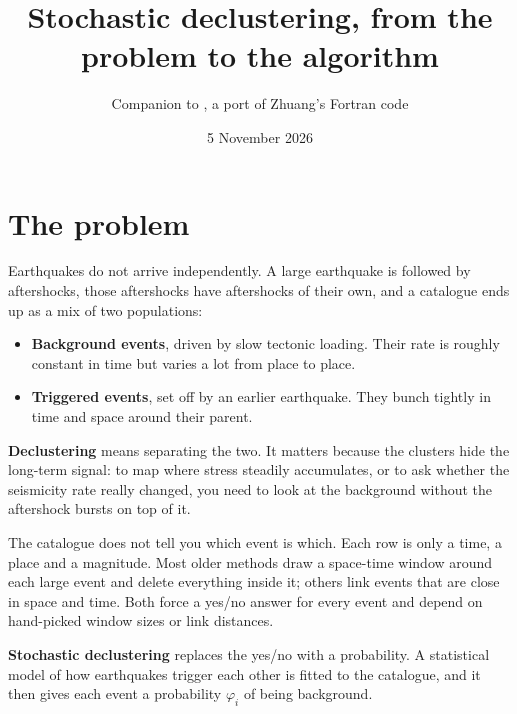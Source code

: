 \documentclass[11pt,a4paper]{article}
\title{Stochastic declustering, from the problem to the algorithm}
\author{Companion to \code{etas8py}, a port of Zhuang's Fortran code}
\date{5 November 2026}
\begin{document}
\maketitle

\section{The problem}

Earthquakes do not arrive independently. A large earthquake is followed by aftershocks, those
aftershocks have aftershocks of their own, and a catalogue ends up as a mix of two populations:

\begin{itemize}
  \item \textbf{Background events}, driven by slow tectonic loading. Their rate is roughly constant
  in time but varies a lot from place to place.
  \item \textbf{Triggered events}, set off by an earlier earthquake. They bunch tightly in
  time and space around their parent.
\end{itemize}

\textbf{Declustering} means separating the two. It matters because the clusters hide the
long-term signal: to map where stress steadily accumulates, or to ask whether the seismicity rate
really changed, you need to look at the background without the aftershock bursts on top of it.

The catalogue does not tell you which event is which. Each row is only a time, a place and a
magnitude. Most older methods draw a space-time window around each large event and delete
everything inside it; others link events that are close in space and time. Both force a yes/no
answer for every event and depend on hand-picked window sizes or link distances.

\textbf{Stochastic declustering} replaces the yes/no with a probability. A statistical model
of how earthquakes trigger each other is fitted to the catalogue, and it then gives each event a
probability $\varphi_i$ of being background.
\end{document}
